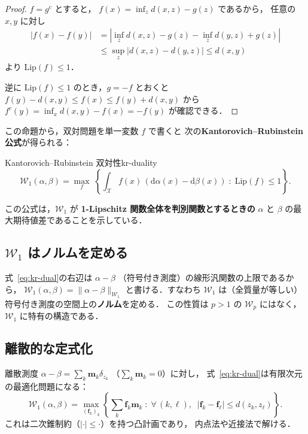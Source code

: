 \begin{proof}
$f = g^c$ とすると，
$f(x) = \inf_{z} d(x, z) - g(z)$ であるから，
任意の $x, y$ に対し
\begin{align*}
  |f(x) - f(y)|
  &= \left|\inf_z d(x,z) - g(z) - \inf_z d(y,z) + g(z)\right| \\
  &\leq \sup_z |d(x,z) - d(y,z)| \leq d(x,y)
\end{align*}
より $\mathrm{Lip}(f) \leq 1$．

逆に $\mathrm{Lip}(f) \leq 1$ のとき，$g = -f$ とおくと
$f(y) - d(x,y) \leq f(x) \leq f(y) + d(x,y)$ から
$f^c(y) = \inf_x d(x,y) - f(x) = -f(y)$ が確認できる．
\end{proof}

この命題から，双対問題を単一変数 $f$ で書くと
次の\textbf{Kantorovich--Rubinstein 公式}が得られる：

\begin{theorem}{Kantorovich--Rubinstein 双対性}{kr-duality}
\begin{equation}\label{eq:kr-dual}
  \mathcal{W}_1(\alpha, \beta)
  = \max_{f}\; \left\{
    \int_{\mathcal{X}} f(x)\, (\mathrm{d}\alpha(x) - \mathrm{d}\beta(x))
    \;:\; \mathrm{Lip}(f) \leq 1
  \right\}.
\end{equation}
\end{theorem}

この公式は，$\mathcal{W}_1$ が
\textbf{1-Lipschitz 関数全体を判別関数とするときの}
$\alpha$ と $\beta$ の最大期待値差であることを示している．

\subsection{$\mathcal{W}_1$ はノルムを定める}\label{subsec:w1-norm}

式~\eqref{eq:kr-dual}の右辺は $\alpha - \beta$
（符号付き測度）の線形汎関数の上限であるから，
$\mathcal{W}_1(\alpha, \beta) = \|\alpha - \beta\|_{\mathcal{W}_1}$
と書ける．すなわち $\mathcal{W}_1$ は（全質量が等しい）
符号付き測度の空間上の\textbf{ノルム}を定める．
この性質は $p > 1$ の $\mathcal{W}_p$ にはなく，
$\mathcal{W}_1$ に特有の構造である．

\subsection{離散的な定式化}\label{subsec:w1-discrete}

離散測度
$\alpha - \beta = \sum_k \mathbf{m}_k \delta_{z_k}$
（$\sum_k \mathbf{m}_k = 0$）に対し，
式~\eqref{eq:kr-dual}は有限次元の最適化問題になる：
\begin{equation}\label{eq:w1-discrete}
  \mathcal{W}_1(\alpha, \beta)
  = \max_{(\mathbf{f}_k)_k} \left\{
    \sum_k \mathbf{f}_k \mathbf{m}_k
    \;:\;
    \forall\, (k, \ell),\;\;
    |\mathbf{f}_k - \mathbf{f}_\ell| \leq d(z_k, z_\ell)
  \right\}.
\end{equation}
これは二次錐制約（$|\cdot| \leq \cdot$）を持つ凸計画であり，
内点法や近接法で解ける．


